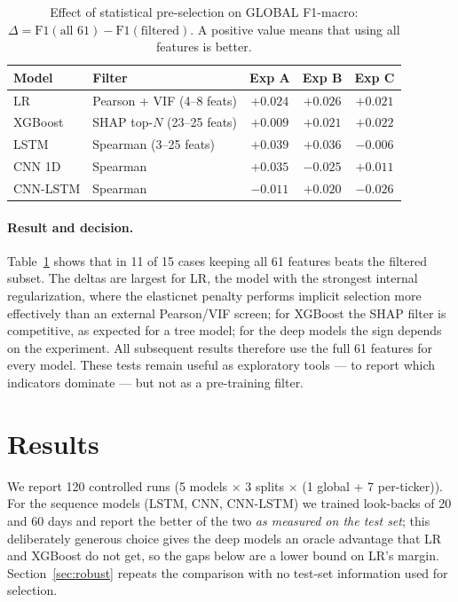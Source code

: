 \documentclass[runningheads]{llncs}
\begin{document}
\begin{table}[t]
\centering
\caption{Effect of statistical pre-selection on GLOBAL F1-macro: $\Delta = \text{F1}(\text{all 61}) - \text{F1}(\text{filtered})$. A positive value means that using all features is better.}
\label{tab:featselect}
\begin{tabular}{llccc}
\toprule
Model & Filter & Exp A & Exp B & Exp C \\
\midrule
LR & Pearson + VIF (4--8 feats)& $+0.024$ & $+0.026$ & $+0.021$ \\
XGBoost & SHAP top-$N$ (23--25 feats)& $+0.009$ & $+0.021$ & $+0.022$ \\
LSTM & Spearman (3--25 feats)& $+0.039$ & $+0.036$ & $-0.006$ \\
CNN 1D & Spearman & $+0.035$ & $-0.025$ & $+0.011$ \\
CNN-LSTM & Spearman & $-0.011$ & $+0.020$ & $-0.026$ \\
\bottomrule
\end{tabular}
\end{table}

\paragraph{Result and decision.}
Table~\ref{tab:featselect} shows that in 11 of 15 cases keeping all 61 features beats the filtered subset. The deltas are largest for LR, the model with the strongest internal regularization, where the elasticnet penalty performs implicit selection more effectively than an external Pearson/VIF screen; for XGBoost the SHAP filter is competitive, as expected for a tree model; for the deep models the sign depends on the experiment. All subsequent results therefore use the full 61 features for every model. These tests remain useful as exploratory tools --- to report which indicators dominate --- but not as a pre-training filter.

\section{Results}
\label{sec:results}

We report 120 controlled runs (5 models $\times$ 3 splits $\times$ (1 global + 7 per-ticker)). For the sequence models (LSTM, CNN, CNN-LSTM) we trained look-backs of 20 and 60 days and report the better of the two \emph{as measured on the test set}; this deliberately generous choice gives the deep models an oracle advantage that LR and XGBoost do not get, so the gaps below are a lower bound on LR's margin. Section~\ref{sec:robust} repeats the comparison with no test-set information used for selection.
\end{document}
